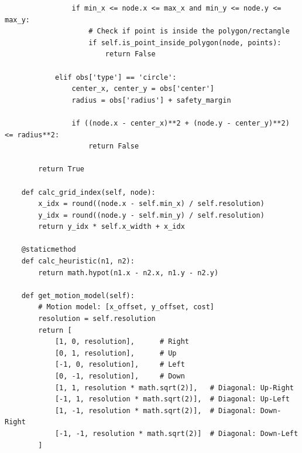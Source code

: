 \begin{lstlisting}
                if min_x <= node.x <= max_x and min_y <= node.y <= max_y:
                    # Check if point is inside the polygon/rectangle
                    if self.is_point_inside_polygon(node, points):
                        return False
                    
            elif obs['type'] == 'circle':
                center_x, center_y = obs['center']
                radius = obs['radius'] + safety_margin
                
                if ((node.x - center_x)**2 + (node.y - center_y)**2) <= radius**2:
                    return False
        
        return True

    def calc_grid_index(self, node):
        x_idx = round((node.x - self.min_x) / self.resolution)
        y_idx = round((node.y - self.min_y) / self.resolution)
        return y_idx * self.x_width + x_idx

    @staticmethod
    def calc_heuristic(n1, n2):
        return math.hypot(n1.x - n2.x, n1.y - n2.y)
    
    def get_motion_model(self):
        # Motion model: [x_offset, y_offset, cost]
        resolution = self.resolution
        return [
            [1, 0, resolution],      # Right
            [0, 1, resolution],      # Up
            [-1, 0, resolution],     # Left
            [0, -1, resolution],     # Down
            [1, 1, resolution * math.sqrt(2)],   # Diagonal: Up-Right
            [-1, 1, resolution * math.sqrt(2)],  # Diagonal: Up-Left
            [1, -1, resolution * math.sqrt(2)],  # Diagonal: Down-Right
            [-1, -1, resolution * math.sqrt(2)]  # Diagonal: Down-Left
        ]
\end{lstlisting}